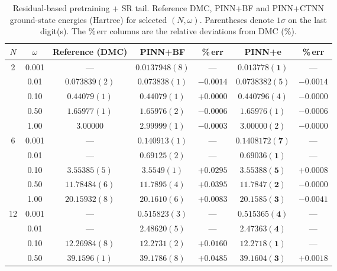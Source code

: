 \documentclass[superscriptaddress,unsortedaddress,amsmath,amssymb,aps]{revtex4-2}
\begin{document}
\begin{table}[t]
  \centering
  \caption{Residual-based pretraining + SR tail. Reference DMC, PINN+BF and PINN+CTNN
  ground-state energies (Hartree) for selected $(N,\omega)$. Parentheses denote
  $1\sigma$ on the last digit(s). The \%\,err columns are the relative deviations
  from DMC (\%).}
  \label{tab:energies}
  \begin{threeparttable}
    \begin{tabular}{c|c|c|cc|cc}
      \toprule
      $N$ & $\omega$ & Reference (DMC) & PINN+BF & \%\,err & PINN+e & \%\,err \\
      \midrule
      2 & 0.001 & --- & $0.0137948(8)$ & --- & $\mathbf{0.013778(1)}$ & --- \\
        & 0.01 & $0.073839(2)$ & $0.073838(1)$ & $-0.0014$  & $0.0738382(5)$ & $-0.0014$ \\
        & 0.10 & $0.44079(1)$  & $0.44079(1)$  & $+0.0000$  & $0.440796(4)$ & $-0.0000$  \\
        & 0.50 & $1.65977(1)$  & $1.65976(2)$  & $-0.0006$  & $1.65976(1)$ & $-0.0006$ \\
        & 1.00 & $3.00000$     & $2.99999(1)$  & $-0.0003$  & $3.00000(2)$ & $-0.0000$  \\
      \midrule
      6 & 0.001 & ---           & $0.140913(1)$ & --- & $\mathbf{0.1408172(7)}$ & --- \\
        & 0.01 & ---            & $0.69125(2)$  & --- & $\mathbf{0.69036(1)}$ & --- \\
        & 0.10 & $3.55385(5)$   & $3.5549(1)$   & $+0.0295$ & $\mathbf{3.55388(5)}$ & $+0.0008$ \\
        & 0.50 & $11.78484(6)$  & $11.7895(4)$  & $+0.0395$  & $\mathbf{11.7847(2)}$ & $-0.0000$ \\
        & 1.00 & $20.15932(8)$  & $20.1610(6)$  & $+0.0083$  & $\mathbf{20.1585(3)}$ & $-0.0041$ \\
      \midrule
      12 & 0.001 & ---          & $0.515823(3)$ & --- & $\mathbf{0.515365(4)}$ & --- \\
         & 0.01 & ---           & $2.48620(5)$  & --- & $\mathbf{2.47363(4)}$ & --- \\
         & 0.10 & $12.26984(8)$ & $12.2731(2)$  & $+0.0160$ & $\mathbf{12.2718(1)}$ & --- \\
         & 0.50 & $39.1596(1)$  & $39.1786(8)$  & $+0.0485$ & $\mathbf{39.1604(3)}$ & $+0.0018$ \\

\end{tabular}
\end{threeparttable}
\end{table}
\end{document}
